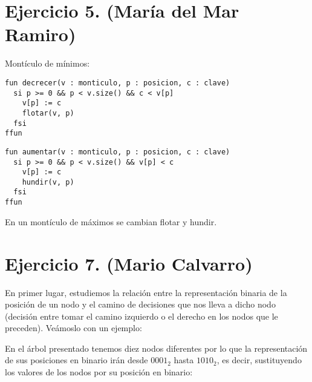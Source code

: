 \documentclass[10pt,a4paper,openright]{book}
\theoremstyle{break}
\newcommand{\missing}{ \edge[edge from parent path={(\tikzparentnode) -- ($ (\tikzparentnode) !.5! (\tikzchildnode) $)}]; \node[draw=none] {};}
\begin{document}
\section{Ejercicio 5. (María del Mar Ramiro)}%
\label{sec:ejercicio_5_maria_del_mar_}
Montículo de mínimos:
\begin{lstlisting}
fun decrecer(v : monticulo, p : posicion, c : clave)
  si p >= 0 && p < v.size() && c < v[p]
    v[p] := c
    flotar(v, p)
  fsi
ffun
\end{lstlisting}

\begin{lstlisting}
fun aumentar(v : monticulo, p : posicion, c : clave) 
  si p >= 0 && p < v.size() && v[p] < c
    v[p] := c
    hundir(v, p)
  fsi
ffun
\end{lstlisting}

En un montículo de máximos se cambian flotar y hundir.

\section{Ejercicio 7. (Mario Calvarro)}%
\label{sec:ejercicio_7_mario_calvarro_}
En primer lugar, estudiemos la relación entre la representación binaria de la posición de un nodo y el camino de decisiones que nos lleva a dicho nodo (decisión entre tomar el camino izquierdo o el derecho en los nodos que le preceden). Veámoslo con un ejemplo:

\begin{center}
\end{center}

En el árbol presentado tenemos diez nodos diferentes por lo que la representación de sus posiciones en binario irán desde $0001_2$ hasta $1010_2$, es decir, sustituyendo los valores de los nodos por su posición en binario:

\begin{center}
\end{center}
\end{document}
